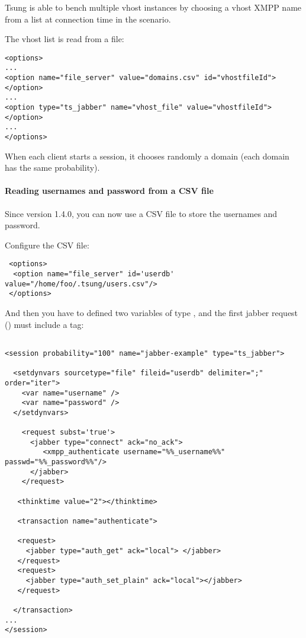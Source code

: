 \documentclass{TSUNG-en}
\begin{document}
Tsung is able to bench multiple vhost instances by choosing a
vhost XMPP name from a list at connection time in the scenario.

The vhost list is read from a file:

\begin{Verbatim}
<options>
...
<option name="file_server" value="domains.csv" id="vhostfileId"></option>
...
<option type="ts_jabber" name="vhost_file" value="vhostfileId"></option>
...
</options>
\end{Verbatim}

When each client starts a session, it chooses randomly a domain (each domain has the
same probability).

\paragraph{Reading usernames and password from a CSV file}

Since version 1.4.0, you can now use a CSV file to store the usernames
and password.

Configure the CSV file:
\begin{Verbatim}
 <options>
  <option name="file_server" id='userdb' value="/home/foo/.tsung/users.csv"/>
 </options>
\end{Verbatim}

And then you have to defined two variables of type ,
and the first jabber request () must include a
 tag:

\begin{Verbatim}

<session probability="100" name="jabber-example" type="ts_jabber">

  <setdynvars sourcetype="file" fileid="userdb" delimiter=";" order="iter">
    <var name="username" />
    <var name="password" />
  </setdynvars>

    <request subst='true'>
      <jabber type="connect" ack="no_ack">
         <xmpp_authenticate username="%%_username%%" passwd="%%_password%%"/>
      </jabber>
    </request>

   <thinktime value="2"></thinktime>

   <transaction name="authenticate">

   <request>
     <jabber type="auth_get" ack="local"> </jabber>
   </request>
   <request>
     <jabber type="auth_set_plain" ack="local"></jabber>
   </request>

  </transaction>
...
</session>
\end{Verbatim}
\end{document}
